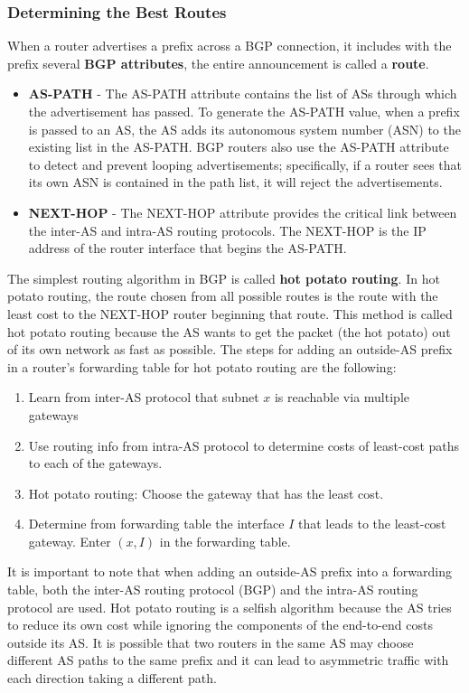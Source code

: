 \subsubsection{Determining the Best Routes}
When a router advertises a prefix across a BGP connection, it includes with the prefix several \textbf{BGP attributes}, the entire announcement is called a \textbf{route}.
\begin{itemize}
\item \textbf{AS-PATH} - The AS-PATH attribute contains the list of ASs through which the advertisement has passed. To generate the AS-PATH value, when a prefix is passed to an AS, the AS adds its autonomous system number (ASN) to the existing list in the AS-PATH. BGP routers also use the AS-PATH attribute to detect and prevent looping advertisements; specifically, if a router sees that its own ASN is contained in the path list, it will reject the advertisements.
\item \textbf{NEXT-HOP} - The NEXT-HOP attribute provides the critical link between the inter-AS and intra-AS routing protocols. The NEXT-HOP is the IP address of the router interface that begins the AS-PATH. 
\end{itemize}
The simplest routing algorithm in BGP is called \textbf{hot potato routing}. In hot potato routing, the route chosen from all possible routes is the route with the least cost to the NEXT-HOP router beginning that route. This method is called hot potato routing because the AS wants to get the packet (the hot potato) out of its own network as fast as possible. The steps for adding an outside-AS prefix in a router's forwarding table for hot potato routing are the following:
\begin{enumerate}
\item Learn from inter-AS protocol that subnet $x$ is reachable via multiple gateways
\item Use routing info from intra-AS protocol to determine costs of least-cost paths to each of the gateways.
\item Hot potato routing: Choose the gateway that has the least cost.
\item Determine from forwarding table the interface $I$ that leads to the least-cost gateway. Enter $(x, I)$ in the forwarding table.
\end{enumerate}
It is important to note that when adding an outside-AS prefix into a forwarding table, both the inter-AS routing protocol (BGP) and the intra-AS routing protocol are used. Hot potato routing is a selfish algorithm because the AS tries to reduce its own cost while ignoring the components of the end-to-end costs outside its AS. It is possible that two routers in the same AS may choose different AS paths to the same prefix and it can lead to asymmetric traffic with each direction taking a different path.\vspace{.3cm}\\
